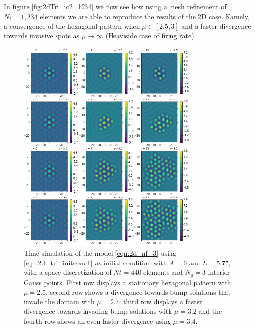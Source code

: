 \documentclass{uonmathreport}
\begin{document}
In figure \ref{fig:2dTri_ic2_1234} we now see how using a mesh refinement of $N_t = 1,234$ elements we are able to reproduce the results of the 2D case. Namely, a convergence of the hexagonal pattern when $\mu \in [2.5, 3]$ and a faster divergence towards invasive spots as $\mu \rightarrow \infty$ (Heaviside case of firing rate).

\begin{figure}[H]
	\begin{center}
		\includegraphics[width=0.8\textwidth]{Figures/2dTri_IC2_440elems.png}
	\end{center}
	\caption{Time simulation of the model \ref{eqn:2d_nf_3} using \ref{eqn:2d_tri_initcond1} as initial condition with $A=6$ and $L=5.77$, with a space discretization of $Nt=440$ elements and $N_g=3$ interior Gauss points. First row displays a stationary hexagonal pattern with $\mu=2.5$, second row shows a divergence towards bump solutions that invade the domain with $\mu=2.7$, third row displays a faster divergence towards invading bump solutions with $\mu=3.2$ and the fourth row shows an even faster divergence using $\mu = 3.4$.}
	\label{fig:2dTri_ic2_440}
\end{figure}
\end{document}
